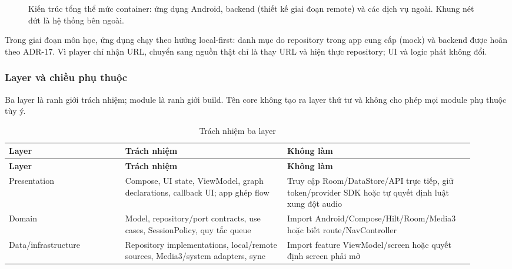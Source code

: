 \begin{figure}[H]
\caption{Kiến trúc tổng thể mức container: ứng dụng Android, backend (thiết kế giai đoạn remote) và các dịch vụ ngoài. Khung nét đứt là hệ thống bên ngoài.}
\label{fig:system-context}
\end{figure}

Trong giai đoạn môn học, ứng dụng chạy theo hướng local-first: danh mục do repository trong app cung cấp (mock) và backend được hoãn theo ADR-17. Vì player chỉ nhận URL, chuyển sang nguồn thật chỉ là thay URL và hiện thực repository; UI và logic phát không đổi.

\subsubsection{Layer và chiều phụ thuộc}
\label{sec:three-layers}

Ba layer là ranh giới trách nhiệm; module là ranh giới build. Tên core không tạo ra layer thứ tư và không cho phép mọi module phụ thuộc tùy ý.

\begingroup
\small
\renewcommand{\arraystretch}{1.2}
\setlength{\tabcolsep}{3pt}
\begin{longtable}{>{\RaggedRight\arraybackslash}p{0.23\linewidth}>{\RaggedRight\arraybackslash}p{0.32\linewidth}>{\RaggedRight\arraybackslash}p{0.37\linewidth}}
\caption{Trách nhiệm ba layer}
\label{tab:three-layers}\\
\toprule
\textbf{Layer} & \textbf{Trách nhiệm} & \textbf{Không làm} \\
\midrule
\endfirsthead
\toprule
\textbf{Layer} & \textbf{Trách nhiệm} & \textbf{Không làm} \\
\midrule
\endhead
\bottomrule
\endfoot
Presentation & Compose, UI state, ViewModel, graph declarations, callback UI; app ghép flow & Truy cập Room/DataStore/API trực tiếp, giữ token/provider SDK hoặc tự quyết định luật xung đột audio \\
Domain & Model, repository/port contracts, use cases, SessionPolicy, quy tắc queue & Import Android/Compose/Hilt/Room/Media3 hoặc biết route/NavController \\
Data/infrastructure & Repository implementations, local/remote sources, Media3/system adapters, sync & Import feature ViewModel/screen hoặc quyết định screen phải mở \\
\end{longtable}
\endgroup

